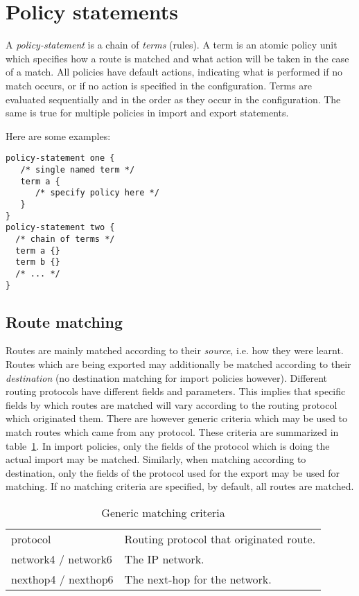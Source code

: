 \documentclass{article}
\begin{document}
\section{Policy statements}
A {\em policy-statement} is a chain of {\em terms} (rules). A term is an atomic
policy unit which specifies how a route is matched and what action will be taken
in the case of a match. All policies have default actions, indicating what is
performed if no match occurs, or if no action is specified in the configuration.
Terms are evaluated sequentially and in the order as they occur in the
configuration. The same is true for multiple policies in import and export
statements.

Here are some examples:
\begin{verbatim}
policy-statement one {
   /* single named term */
   term a {
      /* specify policy here */
   }
}
policy-statement two {
  /* chain of terms */
  term a {}
  term b {}
  /* ... */
}
\end{verbatim}





\subsection{Route matching}
Routes are mainly matched according to their {\em source}, i.e. how they were
learnt. Routes which are being exported may additionally be matched according to
their {\em destination} (no destination matching for import policies however).
Different routing protocols have different fields and parameters. This implies
that specific fields by which routes are matched will vary according to the
routing protocol which originated them. There are however generic criteria which
may be used to match routes which came from any protocol.  These criteria are
summarized in table~\ref{matchgen}. 
In import policies, only the fields of the protocol which is doing the actual
import may be matched. 
Similarly, when matching according to destination, only the fields of the
protocol used for the export may be used for matching. If no matching criteria
are specified, by default, all routes are matched.

\begin{table}
\begin{tabular}{l l}
protocol	     & Routing protocol that originated route. \\
network4 / network6  & The IP network. \\
nexthop4 / nexthop6  & The next-hop for the network. \\
\end{tabular}
\caption{\label{matchgen}Generic matching criteria}
\end{table}
\end{document}
